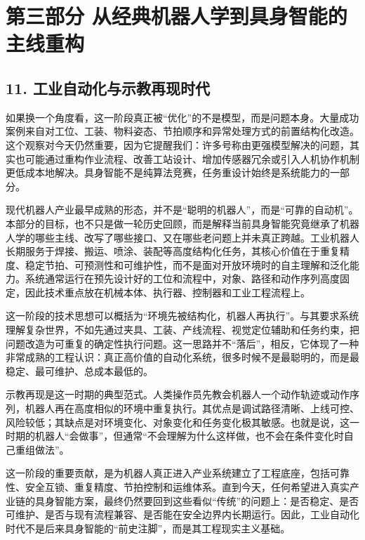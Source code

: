 
\part*{第三部分 从经典机器人学到具身智能的主线重构}

\chapter*{11. 工业自动化与示教再现时代}

如果换一个角度看，这一阶段真正被“优化”的不是模型，而是问题本身。大量成功案例来自对工位、工装、物料姿态、节拍顺序和异常处理方式的前置结构化改造。这个观察对今天仍然重要，因为它提醒我们：许多号称由更强模型解决的问题，其实也可能通过重构作业流程、改善工站设计、增加传感器冗余或引入人机协作机制更低成本地解决。具身智能不是纯算法竞赛，任务重设计始终是系统能力的一部分。

现代机器人产业最早成熟的形态，并不是“聪明的机器人”，而是“可靠的自动机”。本部分的目标，也不只是做一轮历史回顾，而是解释当前具身智能究竟继承了机器人学的哪些主线、改写了哪些接口、又在哪些老问题上并未真正跨越。工业机器人长期服务于焊接、搬运、喷涂、装配等高度结构化任务，其核心价值在于重复精度、稳定节拍、可预测性和可维护性，而不是面对开放环境时的自主理解和泛化能力。系统通常运行在预先设计好的工位和流程中，对象、路径和动作序列高度固定，因此技术重点放在机械本体、执行器、控制器和工业工程流程上。

这一阶段的技术思想可以概括为“环境先被结构化，机器人再执行”。与其要求系统理解复杂世界，不如先通过夹具、工装、产线流程、视觉定位辅助和任务约束，把问题改造为可重复的确定性执行问题。这一思路并不“落后”，相反，它体现了一种非常成熟的工程认识：真正高价值的自动化系统，很多时候不是最聪明的，而是最稳定、最可维护、总成本最低的。

示教再现是这一时期的典型范式。人类操作员先教会机器人一个动作轨迹或动作序列，机器人再在高度相似的环境中重复执行。其优点是调试路径清晰、上线可控、风险较低；其缺点是对环境变化、对象变化和任务变化极其敏感。也就是说，这一时期的机器人“会做事”，但通常“不会理解为什么这样做，也不会在条件变化时自己重组做法”。

这一阶段的重要贡献，是为机器人真正进入产业系统建立了工程底座，包括可靠性、安全互锁、重复精度、节拍控制和运维体系。直到今天，任何希望进入真实产业链的具身智能方案，最终仍然要回到这些看似“传统”的问题上：是否稳定、是否可维护、是否与现有流程兼容、是否能在安全边界内长期运行。因此，工业自动化时代不是后来具身智能的“前史注脚”，而是其工程现实主义基础。

